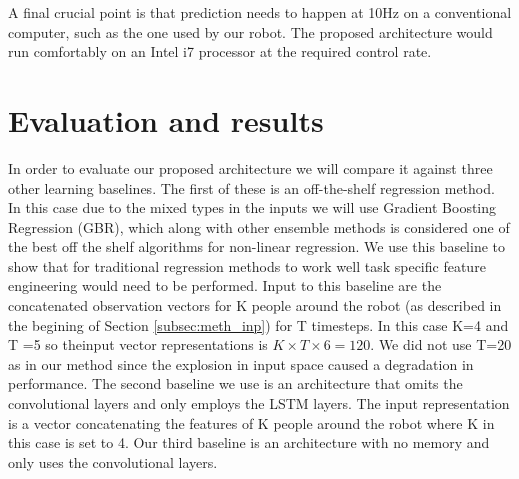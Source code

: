 \documentclass[letterpaper, 10 pt, conference]{ieeeconf}
\begin{document}
A final crucial point is that prediction needs to happen at 10Hz on a conventional computer, such as the one used by our robot. The proposed architecture would run comfortably on an Intel i7 processor at the required control rate.




\section{Evaluation and results}
In order to evaluate our proposed architecture we will compare it against three other learning baselines. The first of these is an off-the-shelf regression method. In this case due to the mixed types in the inputs we will use Gradient Boosting Regression (GBR), which along with other ensemble methods is considered one of the best off the shelf algorithms for non-linear regression. We use this baseline to show that for traditional regression methods to work well task specific feature engineering would need to be performed. Input to this baseline are the concatenated observation vectors for K people around the robot (as described in the begining of Section \ref{subsec:meth_inp}) for T timesteps. In this case K=4 and T =5 so theinput vector representations is $K\times T \times 6 = 120$. We did not use T=20 as in our method since the explosion in input space caused a degradation in performance. The second baseline we use is an architecture that omits the convolutional layers and only employs the LSTM layers. The input representation is a vector concatenating the features of K people around the robot where K in this case is set to 4. Our third baseline is an architecture with no memory and only uses the convolutional layers.
\end{document}
